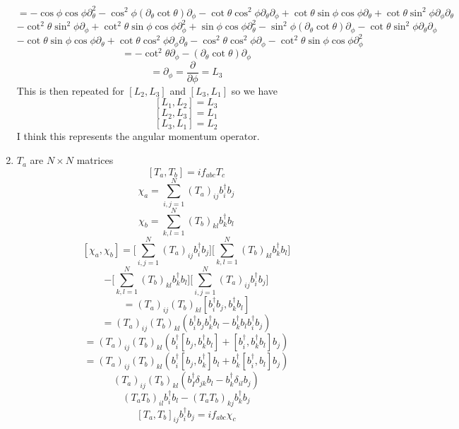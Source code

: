 \documentclass[12pt]{article}
\begin{document}
\begin{enumerate}
  $$ = - \cos \phi \cos \phi \partial^2_{\theta} - \cos^2 \phi ( \partial_{\theta} \cot \theta ) \partial_{\phi} - \cot \theta \cos^2 \phi \partial_{\theta} \partial_{\phi} + \cot \theta \sin \phi \cos \phi \partial_{\theta} + \cot \theta \sin^2 \phi \partial_{\phi} \partial_{\theta}$$
  $$ - \cot^2 \theta \sin^2 \phi \partial_{\phi}  + \cot^2 \theta \sin \phi \cos \phi \partial^2_{\phi} + \sin \phi \cos \phi \partial^2_{\theta} - \sin^2 \phi ( \partial_{\theta} \cot \theta) \partial_{\phi} - \cot \theta \sin^2 \phi \partial_{\theta} \partial_{\phi} $$
   $$  - \cot \theta \sin \phi \cos \phi \partial_{\theta} + \cot \theta \cos^2 \phi \partial_{\phi} \partial_{\theta} - \cos^2 \theta \cos^2 \phi \partial_{\phi} - \cot^2 \theta \sin \phi \cos \phi \partial^2_{\phi} $$
  $$ = - \cot^2 \theta \partial_{\phi} - ( \partial_{\theta} \cot \theta) \partial_{\phi} $$
  $$ = \partial_{\phi} = \frac{\partial}{\partial \phi} = L_3 $$
  This is then repeated for $[L_2, L_3]$ and $[L_3, L_1]$ so we have 
  $$ [L_1, L_2] = L_3 $$
  $$ [L_2, L_3] = L_1 $$
  $$ [L_3, L_1] = L_2 $$
  I think this represents the angular momentum operator.

  \item $T_a$ are $N \times N$ matrices 
  $$ [T_a, T_b] = i f_{abc} T_c $$
  $$ \chi_a = \sum_{i, j = 1 }^N (T_a)_{ij} b_i^{\dagger} b_j $$
  $$ \chi_b = \sum_{k,l = 1}^N (T_b)_{kl} b_k^{\dagger} b_l $$ 
  $$ [\chi_a, \chi_b] = \Big[ \sum_{i,j = 1 }^N (T_a)_{ij} b_i^{\dagger} b_j \Big] \Big[ \sum_{k,l = 1}^N (T_b)_{kl} b_k^{\dagger} b_l \Big] $$
  $$ - \Big[ \sum_{k,l =1}^N (T_b)_{kl} b_k^{\dagger} b_l \Big] \Big[ \sum_{i,j=1}^N (T_a)_{ij} b_i^{\dagger} b_j] $$
  $$ = (T_a)_{ij} (T_b)_{kl} [b_i^{\dagger} b_j, b_k^{\dagger} b_l ] $$
  $$ = (T_a)_{ij} (T_b)_{kl} (b_i^{\dagger} b_j b_k^{\dagger} b_l - b_k^{\dagger} b_l b_i^{\dagger} b_j ) $$
  $$ = (T_a)_{ij} (T_b)_{kl} (b_i^{\dagger} [b_j, b_k^{\dagger} b_l] + [ b_i^{\dagger}, b_k^{\dagger} b_l ] b_j ) $$ 
  $$ = (T_a)_{ij} (T_b)_{kl} (b_i^{\dagger} [b_j, b_k^{\dagger} ] b_l + b_k^{\dagger} [ b_i^{\dagger}, b_l ] b_j ) $$
  $$ (T_a)_{ij} (T_b)_{kl} ( b_I^{\dagger} \delta_{jk} b_l - b_k^{\dagger} \delta_{il} b_j ) $$
  $$ (T_a T_b)_{il} b_i^{\dagger} b_l - (T_a T_b)_{kj} b_k^{\dagger} b_j $$
  $$ [T_a, T_b]_{ij} b_i^{\dagger} b_j = i f_{abc} \chi_c $$


\end{enumerate}
\end{document}
